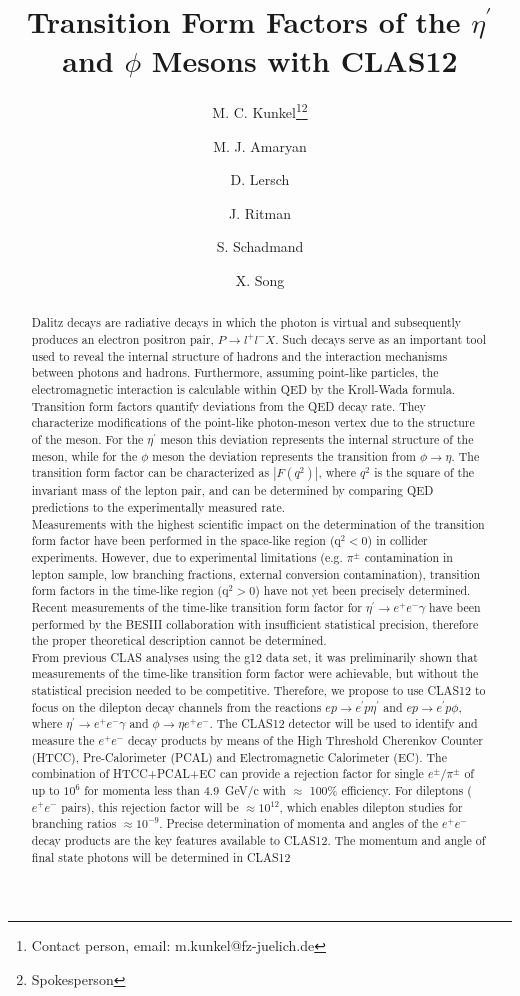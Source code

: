 \documentclass[11pt,a4paper]{article}
\title{Transition Form Factors of the $\eta^{\prime}$ and $\phi$ Mesons with CLAS12}
\date{}
\author[1]{M. C. Kunkel\thanks{Contact person, email: m.kunkel@fz-juelich.de}\thanks{Spokesperson}}
\author[2]{M. J. Amaryan}
\author[1]{D. Lersch}
\author[1]{J. Ritman\samethanks}
\author[1]{S. Schadmand\samethanks}
\author[1]{X. Song}
\affil[1]{Forschungszentrum J\"ulich, J\"ulich (Germany)}
\affil[2]{Old Dominion University (U.S.A.)}
\def\etaP{\eta^{\prime}}
\begin{document}
\maketitle
\thispagestyle{firststyle}
\begin{abstract}
Dalitz decays are radiative decays in which the photon is virtual and subsequently produces an electron positron pair, $P\rightarrow l^+l^-X$. Such decays serve as an important tool used to reveal the internal structure of hadrons and the interaction mechanisms between photons and hadrons. Furthermore, assuming point-like particles, the electromagnetic interaction is calculable within QED by the Kroll-Wada formula. Transition form factors quantify deviations from the QED decay rate. They characterize modifications of the point-like photon-meson vertex due to the structure of the meson. For the $\etaP$ meson this deviation represents the internal structure of the meson, while for the $\phi$ meson the deviation represents the transition from $\phi \to \eta$. The transition form factor can be characterized as $\left| F(q^2)\right|$, where $q^2$ is the square of the invariant mass of the lepton pair, and can be determined by comparing QED predictions to the experimentally measured rate.
\\ 
\indent Measurements with the highest scientific impact on the determination of the transition form factor have been performed in the space-like region ($\mathrm{q}^2<0$) in collider experiments. However, due to experimental limitations (e.g. $\pi^{\pm}$ contamination in lepton sample, low branching fractions, external conversion contamination), transition form factors in the time-like region ($\mathrm{q}^2>0$) have not yet been precisely determined. Recent measurements of the time-like transition form factor for $\etaP \to e^+e^- \gamma$ have been performed by the BESIII collaboration with insufficient statistical precision, therefore the proper theoretical description cannot be determined. 
\\
\indent From previous CLAS analyses using the g12 data set, it was preliminarily shown that measurements of the time-like transition form factor were achievable, but without the statistical precision needed to be competitive. Therefore, we propose to use CLAS12 to focus on the dilepton decay channels from the reactions $ep\rightarrow e^{\prime}p\etaP$ and $ep\rightarrow e^{\prime}p\phi$, where $\etaP \to e^+e^- \gamma$ and $\phi \rightarrow \eta e^+e^-$. The CLAS12 detector will be used to identify and measure the $e^+e^-$ decay products by means of the High Threshold Cherenkov Counter (HTCC), Pre-Calorimeter (PCAL) and Electromagnetic Calorimeter (EC). The combination of HTCC+PCAL+EC can provide a rejection factor for single $e^\pm/\pi^\pm$ of up to $10^6$ for momenta less than 4.9~GeV/c with $\approx$ 100\% efficiency. For dileptons ($e^+e^-$ pairs), this rejection factor will be $\approx 10^{12}$, which enables dilepton studies for branching ratios $\approx 10^{-9}$. Precise determination of momenta and angles of the $e^+e^-$ decay products are the key features available to CLAS12. The momentum and angle of final state photons will be determined in CLAS12

\end{abstract}
\end{document}
